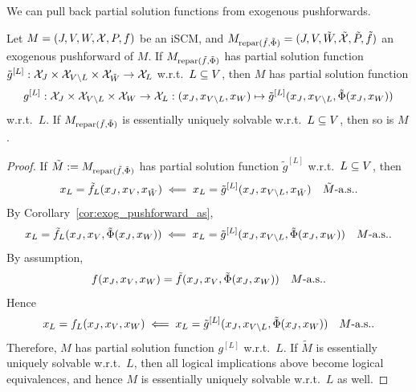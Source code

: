 We can pull back partial solution functions from exogenous pushforwards.
\begin{Lem}\label{lem:exogenous_pushforward_pullback_partial_solution_functions}
  Let $M = \left ( J, V, W, \mathcal{X}, P, f \right )$ be an iSCM, and $M_{\mathrm{repar}({\tilde{f}},{\tilde{\Phi}})} = ( J, V, \tilde{W}, \tilde{\mathcal{X}}, \tilde{P}, \tilde{f} )$ an exogenous pushforward of $M$.
  If $M_{\mathrm{repar}({\tilde{f}},{\tilde{\Phi}})}$ has partial solution function $\tilde{g}^{[L]} : \mathcal{X}_J \times \mathcal{X}_{V\setminus L} \times \mathcal{X}_{\tilde{W}} \to \mathcal{X}_L$ w.r.t.\ $L \subseteq V$, then $M$ has partial solution function 
  $$g^{[L]} : \mathcal{X}_J \times \mathcal{X}_{V\setminus L} \times \mathcal{X}_W \to \mathcal{X}_L : (x_J,x_{V\setminus L},x_W) \mapsto \tilde{g}^{[L]} (x_J,x_{V\setminus L},\tilde{\Phi}(x_J,x_W))$$
  w.r.t.\ $L$.
  If $M_{\mathrm{repar}({\tilde{f}},{\tilde{\Phi}})}$ is essentially uniquely solvable w.r.t.\ $L \subseteq V$, then so is $M$.
\end{Lem}
\begin{proof}
  If $\tilde{M} := M_{\mathrm{repar}({\tilde{f}},{\tilde{\Phi}})}$ has partial solution function $\tilde{g}^{[L]}$ w.r.t.\ $L \subseteq V$, then
  $$x_L = \tilde{f}_L(x_J,x_V,x_{\tilde{W}}) \impliedby x_L = \tilde{g}^{[L]}(x_J,x_{V\setminus L},x_{\tilde{W}}) \quad \tilde{M}\text{-a.s.}.$$
  By Corollary~\ref{cor:exog_pushforward_as},
  $$x_L = \tilde{f}_L(x_J,x_V,\tilde{\Phi}(x_J,x_W)) \impliedby x_L = \tilde{g}^{[L]}(x_J,x_{V\setminus L},\tilde{\Phi}(x_J,x_W)) \quad M\text{-a.s.}.$$
  By assumption,
    $$f(x_J,x_V,x_W) = \tilde{f}(x_J,x_V,\tilde{\Phi}(x_J,x_W)) \quad M\text{-a.s.}.$$
  Hence
    $$x_L = f_L(x_J,x_V,x_W) \impliedby x_L = \tilde{g}^{[L]}(x_J,x_{V\setminus L},\tilde{\Phi}(x_J,x_W)) \quad M\text{-a.s.}.$$
  Therefore, $M$ has partial solution function $g^{[L]}$ w.r.t.\ $L$.
  If $\tilde{M}$ is essentially uniquely solvable w.r.t.\ $L$, then all logical implications above become logical equivalences, and hence $M$ is essentially uniquely solvable w.r.t.\ $L$ as well.
\end{proof}

